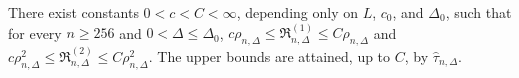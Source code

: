 There exist constants \(0<c<C<\infty\), depending only on \(L\), \(c_0\), and \(\Delta_0\), such that for every \(n\geq256\) and \(0<\Delta\leq\Delta_0\), \(c\rho_{n,\Delta}\leq\mathfrak R^{(1)}_{n,\Delta}\leq C\rho_{n,\Delta}\) and \(c\rho_{n,\Delta}^2\leq\mathfrak R^{(2)}_{n,\Delta}\leq C\rho_{n,\Delta}^2\). The upper bounds are attained, up to \(C\), by \(\widehat\tau_{n,\Delta}\).